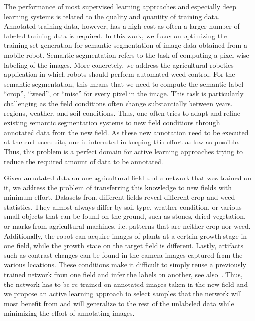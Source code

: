 \documentclass[letterpaper, 10 pt, conference]{ieeeconf}  %
\begin{document}
The performance of most supervised learning approaches and especially deep
learning  systems is related to the quality and quantity of training data.
Annotated training data, however, has a high cost as often a larger number of
labeled training data is  required.  In this work, we focus on optimizing the
training set generation for  semantic segmentation of image data obtained
from a mobile robot. Semantic segmentation refers to the task of computing a
pixel-wise  labeling of the images. More concretely, we address the
agricultural robotics  application in which robots should perform automated
weed control. For the semantic  segmentation, this means that we need to
compute the semantic label ``crop'', ``weed'',  or ``misc'' for every pixel in
the image. This task is particularly challenging  as the field conditions
often change substantially between years, regions, weather, and  soil
conditions. Thus, one often tries to adapt and refine existing semantic
segmentation systems to new field conditions through annotated data from the
new field. As these new annotation need to be executed at the end-users site,
one is interested in keeping this effort as low as possible. Thus, this
problem is a perfect domain for active  learning approaches trying to reduce
the required amount of data to be annotated.

Given annotated data on one agricultural field and a network that was trained
on it, we address the problem of transferring this knowledge to new fields with
minimum effort.  Datasets from different fields reveal different crop and weed
statistics. They almost  always differ by soil type, weather condition, or
various small objects that can be found  on the ground, such as stones, dried
vegetation, or marks from agricultural machines,  i.e. patterns that are
neither crop nor weed. Additionally, the robot can acquire  images of plants
at a certain growth stage in one field, while the growth state on the  target
field is different. Lastly, artifacts such as contrast changes can be found in
the camera images captured from the various locations.  These conditions make
it difficult to simply reuse a previously trained network from one  field and
infer the labels on another, see also~\cite{lottes2018ral,lottes2017iros}. Thus, 
the network has to be
re-trained on  annotated images taken in the new field and we propose an
active learning  approach to select samples that the network will most benefit
from and will generalize  to the rest of the unlabeled data while minimizing
the effort of annotating images.
\end{document}

